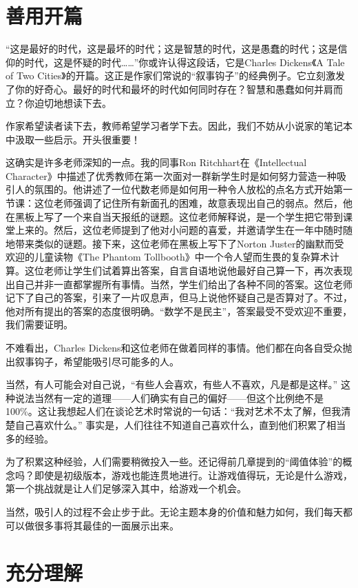 \section*{善用开篇}

“这是最好的时代，这是最坏的时代；这是智慧的时代，这是愚蠢的时代；这是信仰的时代，这是怀疑的时代……”你或许认得这段话，它是Charles Dickens《A Tale of Two Cities》的开篇。这正是作家们常说的“叙事钩子”的经典例子。它立刻激发了你的好奇心。最好的时代和最坏的时代如何同时存在？智慧和愚蠢如何并肩而立？你迫切地想读下去。

作家希望读者读下去，教师希望学习者学下去。因此，我们不妨从小说家的笔记本中汲取一些启示。开头很重要！

这确实是许多老师深知的一点。我的同事Ron Ritchhart在《Intellectual Character》中描述了优秀教师在第一次面对一群新学生时是如何努力营造一种吸引人的氛围的。他讲述了一位代数老师是如何用一种令人放松的点名方式开始第一节课：这位老师强调了记住所有新面孔的困难，故意表现出自己的弱点。然后，他在黑板上写了一个来自当天报纸的谜题。这位老师解释说，是一个学生把它带到课堂上来的。然后，这位老师提到了他对小问题的喜爱，并邀请学生在一年中随时随地带来类似的谜题。接下来，这位老师在黑板上写下了Norton Juster的幽默而受欢迎的儿童读物《The Phantom Tollbooth》中一个令人望而生畏的复杂算术计算。这位老师让学生们试着算出答案，自言自语地说他最好自己算一下，再次表现出自己并非一直都掌握所有事情。当然，学生们给出了各种不同的答案。这位老师记下了自己的答案，引来了一片叹息声，但马上说他怀疑自己是否算对了。不过，他对所有提出的答案的态度很明确。“数学不是民主”，答案最受不受欢迎不重要，我们需要证明。

不难看出，Charles Dickens和这位老师在做着同样的事情。他们都在向各自受众抛出叙事钩子，希望能吸引尽可能多的人。

当然，有人可能会对自己说，“有些人会喜欢，有些人不喜欢，凡是都是这样。” 这种说法当然有一定的道理——人们确实有自己的偏好——但这个比例绝不是100\%。这让我想起人们在谈论艺术时常说的一句话：“我对艺术不太了解，但我清楚自己喜欢什么。” 事实是，人们往往不知道自己喜欢什么，直到他们积累了相当多的经验。

为了积累这种经验，人们需要稍微投入一些。还记得前几章提到的“阈值体验”的概念吗？即使是初级版本，游戏也能连贯地进行。让游戏值得玩，无论是什么游戏，第一个挑战就是让人们足够深入其中，给游戏一个机会。

当然，吸引人的过程不会止步于此。无论主题本身的价值和魅力如何，我们每天都可以做很多事将其最佳的一面展示出来。

\section*{充分理解}


